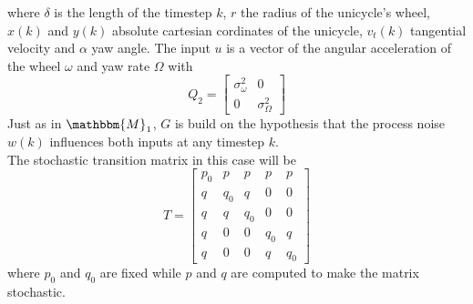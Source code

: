 \documentclass[twocolumn]{article}
\begin{document}
where $\delta$ is the length of the timestep $k$, $r$ the radius of the unicycle's wheel, $x(k)$ and $y(k)$ absolute cartesian cordinates of the unicycle,
$v_{t}(k)$ tangential velocity and $\alpha$ yaw angle.
The input $u$ is a vector of the angular acceleration of the wheel $\omega$ and yaw rate $\Omega$ with
\begin{equation*}
    Q_{2}=\begin{bmatrix}
        \sigma^{2}_{\omega} & 0                   \\
        0                   & \sigma^{2}_{\Omega}
    \end{bmatrix}
\end{equation*}
Just as in $\mathbbm{M}_{1}$, $G$ is build on the hypothesis that the process noise $w(k)$ influences both inputs at any timestep $k$.
\\
The stochastic transition matrix in this case will be
\begin{equation*}
    T=\begin{bmatrix}
        p_{0} & p     & p     & p     & p     \\
        q     & q_{0} & q     & 0     & 0     \\
        q     & q     & q_{0} & 0     & 0     \\
        q     & 0     & 0     & q_{0} & q     \\
        q     & 0     & 0     & q     & q_{0}
    \end{bmatrix}
\end{equation*}
where $p_{0}$ and $q_{0}$ are fixed while $p$ and $q$ are computed to make the matrix stochastic.
\end{document}
